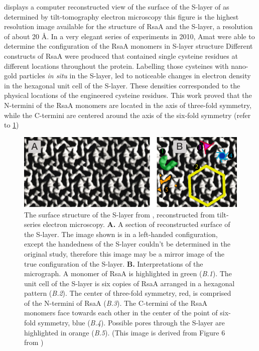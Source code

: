  displays a computer reconstructed view of the surface of the \ac{S-layer} of \caulobacter as determined by tilt-tomography electron microscopy this figure is the highest resolution image available for the structure of RsaA and the \ac{S-layer}, a resolution of about 20 \AA{}. 
In a very elegant series of experiments in 2010, Amat \etal were able to determine the configuration of the RsaA monomers in \ac{S-layer} structure Different constructs of RsaA were produced that contained single cysteine residues at different locations throughout the protein.  Labelling those cysteines with nano-gold particles \textit{in situ} in the \ac{S-layer}, led to noticeable changes in electron density in the hexagonal unit cell of the \ac{S-layer}. These densities corresponded to the physical locations of the engineered cysteine residues. This work proved that the N-termini of the RsaA monomers are  located in the axis of three-fold symmetry, while the C-termini are centered around the axis of the six-fold symmetry (refer to \cref{fig:intro-micrograph})

\begin{figure}[htb]
  \begin{center}
    \includegraphics[width=\textwidth]{intro/img/slayermicrograph.pdf}
  \end{center}
  \caption[Reconstructed surface of the \caulobacter \ac{S-layer}]{
    The surface structure of the \ac{S-layer} from \caulobacter, reconstructed from tilt-series electron microscopy. \textbf{A.} A section of reconstructed surface of the \caulobacter \ac{S-layer}. The image shown is in a left-handed configuration, except the handedness of the \ac{S-layer} couldn't be determined in the original study, therefore this image may be a mirror image of the true configuration of the \ac{S-layer}. \textbf{B.} Interpretations of the micrograph.  A monomer of RsaA is highlighted in green (\textit{B.1}).  The unit cell of the \ac{S-layer} is six copies of RsaA arranged in a hexagonal pattern (\textit{B.2}).  The center of three-fold symmetry, red, is comprised of the N-termini of RsaA (\textit{B.3}).  The C-termini of the RsaA monomers face towards each other in the center of the point of six-fold symmetry, blue (\textit{B.4}). Possible pores through the \ac{S-layer} are highlighted in orange (\textit{B.5}). (This image is derived from Figure 6 from )
  }
  \label{fig:intro-micrograph}
\end{figure}   

